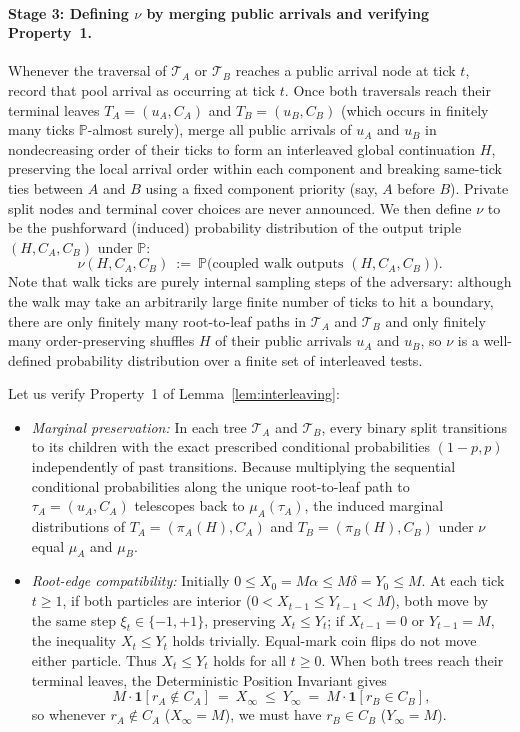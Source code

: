 \documentclass[11pt,letterpaper]{article}
\begin{document}
\paragraph{Stage 3: Defining $\nu$ by merging public arrivals and verifying Property~1.}
Whenever the traversal of $\mathcal T_A$ or $\mathcal T_B$ reaches a public arrival node at tick $t$, record that pool arrival as occurring at tick $t$. Once both traversals reach their terminal leaves $T_A=(u_A,C_A)$ and $T_B=(u_B,C_B)$ (which occurs in finitely many ticks $\mathbb P$-almost surely), merge all public arrivals of $u_A$ and $u_B$ in nondecreasing order of their ticks to form an interleaved global continuation $H$, preserving the local arrival order within each component and breaking same-tick ties between $A$ and $B$ using a fixed component priority (say, $A$ before $B$). Private split nodes and terminal cover choices are never announced. We then define $\nu$ to be the pushforward (induced) probability distribution of the output triple $(H,C_A,C_B)$ under $\mathbb P$:
\[
  \nu(H,C_A,C_B)\ :=\ \mathbb P\bigl(\text{coupled walk outputs }(H,C_A,C_B)\bigr).
\]
Note that walk ticks are purely internal sampling steps of the adversary: although the walk may take an arbitrarily large finite number of ticks to hit a boundary, there are only finitely many root-to-leaf paths in $\mathcal T_A$ and $\mathcal T_B$ and only finitely many order-preserving shuffles $H$ of their public arrivals $u_A$ and $u_B$, so $\nu$ is a well-defined probability distribution over a finite set of interleaved tests.

Let us verify Property~1 of Lemma~\ref{lem:interleaving}:
\begin{itemize}
\item \emph{Marginal preservation:} In each tree $\mathcal T_A$ and $\mathcal T_B$, every binary split transitions to its children with the exact prescribed conditional probabilities $(1-p,p)$ independently of past transitions. Because multiplying the sequential conditional probabilities along the unique root-to-leaf path to $\tau_A=(u_A,C_A)$ telescopes back to $\mu_A(\tau_A)$, the induced marginal distributions of $T_A=(\pi_A(H),C_A)$ and $T_B=(\pi_B(H),C_B)$ under $\nu$ equal $\mu_A$ and $\mu_B$.
\item \emph{Root-edge compatibility:} Initially $0\le X_0 = M\alpha \le M\delta = Y_0 \le M$. At each tick $t\ge 1$, if both particles are interior ($0<X_{t-1}\le Y_{t-1}<M$), both move by the same step $\xi_t\in\{-1,+1\}$, preserving $X_t\le Y_t$; if $X_{t-1}=0$ or $Y_{t-1}=M$, the inequality $X_t\le Y_t$ holds trivially. Equal-mark coin flips do not move either particle. Thus $X_t\le Y_t$ holds for all $t\ge 0$. When both trees reach their terminal leaves, the Deterministic Position Invariant gives
\[
  M\cdot\mathbf 1[r_A\notin C_A]\ =\ X_\infty\ \le\ Y_\infty\ =\ M\cdot\mathbf 1[r_B\in C_B],
\]
so whenever $r_A\notin C_A$ ($X_\infty=M$), we must have $r_B\in C_B$ ($Y_\infty=M$).
\end{itemize}
\end{document}
